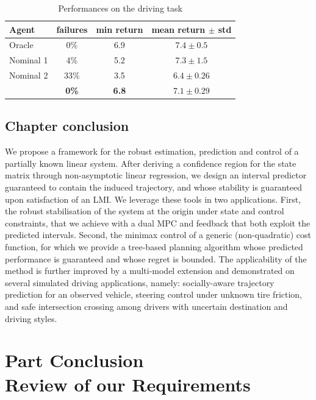 \begin{table}[t]
	\caption{Performances on the driving task}
	\label{tab:driving}
	\centering
	\begin{tabular}{lccc}
		\toprule
		Agent &
		failures &
		min return &
		mean return $\pm$ std  \\
		\midrule
		Oracle & 0\% & {6.9} & $7.4 \pm 0.5$ \\
		\midrule
		{Nominal 1} & 4\% & {5.2} & $\mathbf{7.3} \pm 1.5$ \\
		{Nominal 2} & 33\% & {3.5} & $6.4 \pm 0.26$ \\
		\Cref{alg:full} & \textbf{0\%} & \textbf{6.8} & $7.1 \pm 0.29$ \\
		\bottomrule
	\end{tabular}
\end{table}

\section*{Chapter conclusion}

We propose a framework for the robust estimation, prediction and control of a partially known linear system. After deriving a confidence region for the state matrix through non-asymptotic linear regression, we design an interval predictor guaranteed to contain the induced trajectory, and whose stability is guaranteed upon satisfaction of an \gls{LMI}. We leverage these tools in two applications. First, the robust stabilisation of the system at the origin under state and control constraints, that we achieve with a dual \gls{MPC} and feedback that both exploit the predicted intervals. Second, the minimax control of a generic (non-quadratic) cost function, for which we provide a tree-based planning algorithm whose predicted performance is guaranteed and whose regret is bounded. The applicability of the method is further improved by a multi-model extension and demonstrated on several simulated driving applications, namely: socially-aware trajectory prediction for an observed vehicle, steering control under unknown tire friction, and safe intersection crossing among drivers with uncertain destination and driving styles.

%


\chapter*{Part Conclusion\\ {\LARGE Review of our Requirements}}

